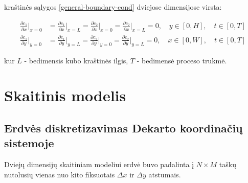 kraštinės sąlygos \eqref{general-boundary-cond} dviejose dimensijose virsta:

\begin{equation} \label{boundary-cond}
\begin{split}
\frac{\partial c_1}{\partial x}\Big|_{x=0}&=\frac{\partial c_1}{\partial x}\Big|_{x=L}=\frac{\partial c_2}{\partial x}\Big|_{x=0}=\frac{\partial c_2}{\partial x}\Big|_{x=L}=0, \quad y\in[0,H], \quad t\in[0,T]\\
\frac{\partial c_1}{\partial y}\Big|_{y=0}&=\frac{\partial c_1}{\partial y}\Big|_{y=L}=\frac{\partial c_2}{\partial y}\Big|_{y=0}=\frac{\partial c_2}{\partial y}\Big|_{y=L}=0, \quad x\in[0,W],\quad t\in[0,T]
\end{split}
\end{equation}

kur $L$ - bedimensis kubo kraštinės ilgis, $T$ - bedimensė proceso trukmė.

\section{Skaitinis modelis}

\subsection{Erdvės diskretizavimas Dekarto koordinačių sistemoje}

Dviejų dimensijų skaitiniam modeliui erdvė buvo padalinta į $N \times M$ taškų 
nutolusių vienas nuo kito fiksuotais $\Delta x$ ir $\Delta y$ atstumais.

